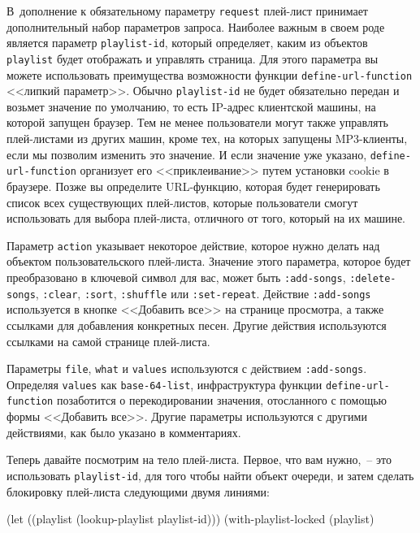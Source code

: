 В~дополнение к обязательному параметру \lstinline{request} плей-лист принимает
дополнительный набор параметров запроса.  Наиболее важным в своем роде является параметр
\lstinline{playlist-id}, который определяет, каким из объектов \lstinline{playlist} будет
отображать и управлять страница. Для этого параметра вы можете использовать преимущества
возможности функции \lstinline{define-url-function} <<липкий параметр>>. Обычно
\lstinline{playlist-id} не будет обязательно передан и возьмет значение по умолчанию, то
есть IP-адрес клиентской машины, на которой запущен браузер. Тем не менее пользователи
могут также управлять плей-листами из других машин, кроме тех, на которых запущены
MP3-клиенты, если мы позволим изменить это значение. И если значение уже указано,
\lstinline{define-url-function} организует его <<приклеивание>> путем установки cookie в
браузере. Позже вы определите URL-функцию, которая будет генерировать список всех
существующих плей-листов, которые пользователи смогут использовать для выбора плей-листа,
отличного от того, который на их машине.

Параметр \lstinline{action} указывает некоторое действие, которое нужно делать над объектом
пользовательского плей-листа. Значение этого параметра, которое будет преобразовано в
ключевой символ для вас, может быть \lstinline{:add-songs}, \lstinline{:delete-songs},
\lstinline{:clear}, \lstinline{:sort}, \lstinline{:shuffle} или \lstinline{:set-repeat}. Действие
\lstinline{:add-songs} используется в кнопке <<Добавить все>> на странице просмотра, а также
ссылками для добавления конкретных песен. Другие действия используются ссылками на самой
странице плей-листа.

Параметры \lstinline{file}, \lstinline{what} и \lstinline{values} используются с действием
\lstinline{:add-songs}. Определяя \lstinline{values} как \lstinline{base-64-list}, инфраструктура функции
\lstinline{define-url-function} позаботится о перекодировании значения, отосланного с помощью
формы <<Добавить все>>. Другие параметры используются с другими действиями, как было указано
в комментариях.

Теперь давайте посмотрим на тело плей-листа. Первое, что вам нужно,~-- это использовать
\lstinline{playlist-id}, для того чтобы найти объект очереди, и затем сделать блокировку
плей-листа следующими двумя линиями:

\begin{myverb}
(let ((playlist (lookup-playlist playlist-id)))
  (with-playlist-locked (playlist)
\end{myverb}

